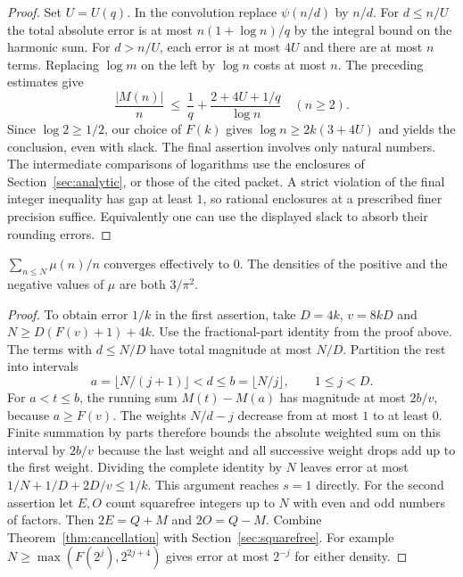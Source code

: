 \begin{proof}
Set $U=U(q)$. In the convolution replace $\psi(n/d)$ by $n/d$. For $d\le n/U$ the total absolute error is at most $n(1+\log n)/q$ by the integral bound on the harmonic sum. For $d>n/U$, each error is at most $4U$ and there are at most $n$ terms. Replacing $\log m$ on the left by $\log n$ costs at most $n$. The preceding estimates give
\[
 \frac{|M(n)|}{n}\ \le\ \frac1q+
                 \frac{2+4U+1/q}{\log n}\quad(n\ge2).
\]
Since $\log 2\ge1/2$, our choice of $F(k)$ gives $\log n\ge2k(3+4U)$ and yields the conclusion, even with slack. The final assertion involves only natural numbers. The intermediate comparisons of logarithms use the enclosures of Section~\ref{sec:analytic}, or those of the cited packet. A strict violation of the final integer inequality has gap at least $1$, so rational enclosures at a prescribed finer precision suffice. Equivalently one can use the displayed slack to absorb their rounding errors.
\end{proof}

\begin{corollary}\label{cor:recip-one}
$\sum_{n\le N}\mu(n)/n$ converges effectively to $0$. The densities of the positive and the negative values of $\mu$ are both $3/\pi^2$.
\end{corollary}
\begin{proof}
To obtain error $1/k$ in the first assertion, take $D=4k$, $v=8kD$ and $N\ge D(F(v)+1)+4k$. Use the fractional-part identity from the proof above. The terms with $d\le N/D$ have total magnitude at most $N/D$. Partition the rest into intervals
\[
 a=\lfloor N/(j+1)\rfloor<d\le b=\lfloor N/j\rfloor,\qquad 1\le j<D.
\]
For $a<t\le b$, the running sum $M(t)-M(a)$ has magnitude at most $2b/v$, because $a\ge F(v)$. The weights $N/d-j$ decrease from at most $1$ to at least $0$. Finite summation by parts therefore bounds the absolute weighted sum on this interval by $2b/v$ because the last weight and all successive weight drops add up to the first weight. Dividing the complete identity by $N$ leaves error at most $1/N+1/D+2D/v\le1/k$. This argument reaches $s=1$ directly.
For the second assertion let $E,O$ count squarefree integers up to $N$ with even and odd numbers of factors. Then $2E=Q+M$ and $2O=Q-M$. Combine Theorem~\ref{thm:cancellation} with Section~\ref{sec:squarefree}. For example $N\ge\max(F(2^j),2^{2j+4})$ gives error at most $2^{-j}$ for either density.
\end{proof}
